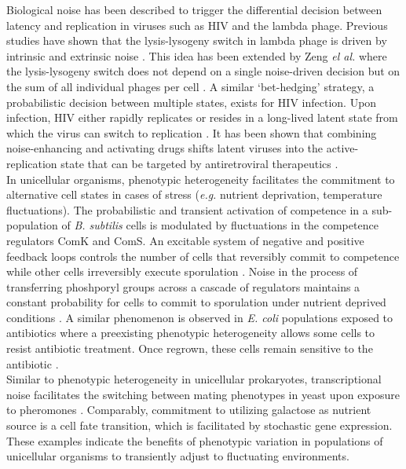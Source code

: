 Biological noise has been described to trigger the differential decision between latency and replication in viruses such as HIV and the lambda phage. Previous studies have shown that the lysis-lysogeny switch in lambda phage is driven by intrinsic and extrinsic noise \citep{Arkin1998, St-Pierre2008}. This idea has been extended by Zeng \textit{el al.} where the lysis-lysogeny switch does not depend on a single noise-driven decision but on the sum of all individual phages per cell \citep{Zeng2010}. A similar ‘bet-hedging’ strategy, a probabilistic decision between multiple states, exists for HIV infection. Upon infection, HIV either rapidly replicates or resides in a long-lived latent state from which the virus can switch to replication \citep{Weinberger2015}. It has been shown that combining noise-enhancing and activating drugs shifts latent viruses into the active-replication state that can be targeted by antiretroviral therapeutics \citep{Dar2014}.  \\
In unicellular organisms, phenotypic heterogeneity facilitates the commitment to alternative cell states in cases of stress (\emph{e.g.} nutrient deprivation, temperature fluctuations). The probabilistic and transient activation of competence in a sub-population of \textit{B. subtilis} cells is modulated by fluctuations in the competence regulators ComK and ComS. An excitable system of negative and positive feedback loops controls the number of cells that reversibly commit to competence while other cells irreversibly execute sporulation \citep{Suel2006}. Noise in the process of transferring phoshporyl groups across a cascade of regulators maintains a constant probability for cells to commit to sporulation under nutrient deprived conditions \citep{Russell2017}. A similar phenomenon is observed in \textit{E. coli} populations exposed to antibiotics where a preexisting phenotypic heterogeneity allows some cells to resist antibiotic treatment. Once regrown, these cells remain sensitive to the antibiotic \citep{Balaban2004}. \\
Similar to phenotypic heterogeneity in unicellular prokaryotes, transcriptional noise facilitates the switching between mating phenotypes in yeast upon exposure to pheromones \citep{Paliwal2007}. Comparably, commitment to utilizing galactose as nutrient source is a cell fate transition, which is facilitated by stochastic gene expression\cite{Acar2008}. \\
These examples indicate the benefits of phenotypic variation in populations of unicellular organisms to transiently adjust to fluctuating environments.   



